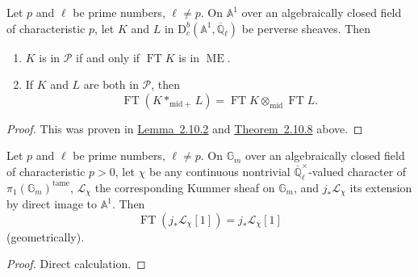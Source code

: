 Let \(p\) and \(\ell\) be prime numbers, \(\ell\ne p\). On \(\mathbb{A}^1\)
over an algebraically closed field of characteristic \(p\), let \(K\) and
\(L\) in \(\mathrm{D}^b_c(\mathbb{A}^1,\overline{\mathbb{Q}}_\ell)\) be
perverse sheaves. Then
\begin{enumerate}[label=(\arabic*)]
\item \(K\) is in \(\mathcal{P}\) if and only if \(\operatorname{FT}K\) is in
\(\operatorname{ME}\).
\item If \(K\) and \(L\) are both in \(\mathcal{P}\), then
\[
  \operatorname{FT}(K*_{\mathrm{mid}+}L)
  =
  \operatorname{FT}K\otimes_{\mathrm{mid}}\operatorname{FT}L.
\]
\end{enumerate}

\begin{proof}
This was proven in \hyperref[lem:2.10.2]{Lemma~2.10.2} and
\hyperref[thm:2.10.8]{Theorem~2.10.8} above.
\end{proof}

Let \(p\) and \(\ell\) be prime numbers, \(\ell\ne p\). On \(\mathbb{G}_m\)
over an algebraically closed field of characteristic \(p>0\), let \(\chi\) be
any continuous nontrivial \(\overline{\mathbb{Q}}_\ell^\times\)-valued
character of \(\pi_1(\mathbb{G}_m)^{\mathrm{tame}}\), \(\mathcal{L}_\chi\) the
corresponding Kummer sheaf on \(\mathbb{G}_m\), and \(j_*\mathcal{L}_\chi\)
its extension by direct image to \(\mathbb{A}^1\). Then
\[
  \operatorname{FT}(j_*\mathcal{L}_{\chi}[1])
  =
  j_*\mathcal{L}_{\overline{\chi}}[1]
\]
(geometrically).

\begin{proof}
Direct calculation.
\end{proof}

